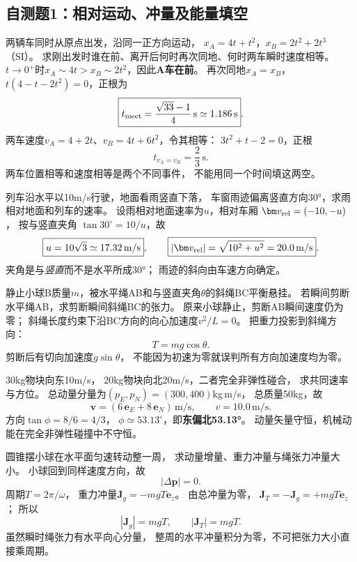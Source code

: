 \subsection{自测题1：相对运动、冲量及能量填空}

\problemtext 两辆车同时从原点出发，沿同一正方向运动，
$ x_A=4t+t^2$，$x_B=2t^2+2t^3$（SI）。
求刚出发时谁在前、离开后何时再次同地、何时两车瞬时速度相等。
\workings
$t\to0^+$时$x_A\sim4t>x_B\sim2t^2$，因此\textbf{A车在前}。
再次同地$x_A=x_B$，
$t(4-t-2t^2)=0$，正根为
\[
\boxed{t_{\rm meet}=\frac{\sqrt{33}-1}{4}\,\mathrm s
\simeq1.186\,\mathrm s}.
\]
两车速度$v_A=4+2t$、$v_B=4t+6t^2$，令其相等：
$3t^2+t-2=0$，正根
\[
\boxed{t_{v_A=v_B}=\frac23\,\mathrm s}.
\]
\crosscheck 两车位置相等和速度相等是两个不同事件，
不能用同一个时间填这两空。

\problemtext 列车沿水平以10m/s行驶，地面看雨竖直下落，
车窗雨迹偏离竖直方向30°，求雨相对地面和列车的速率。
\workings
设雨相对地面速率为$u$，相对车厢
$\bm v_{\rm rel}=(-10,-u)$，
按与竖直夹角
$\tan30^\circ=10/u$，故
\[
\boxed{u=10\sqrt3\simeq17.32\,\mathrm{m/s}},
\qquad
\boxed{|\bm v_{\rm rel}|=\sqrt{10^2+u^2}
=20.0\,\mathrm{m/s}}.
\]
\crosscheck 夹角是与\emph{竖直}而不是水平所成30°；
雨迹的斜向由车速方向确定。

\problemtext 静止小球B质量$m$，被水平绳AB和与竖直夹角$\theta$的斜绳BC平衡悬挂。
若瞬间剪断水平绳AB，求剪断瞬间斜绳BC的张力。
\workings
原来小球静止，剪断AB瞬间速度仍为零；
斜绳长度约束下沿BC方向的向心加速度$v^2/L=0$。
把重力投影到斜绳方向：
\[
\boxed{T=mg\cos\theta}.
\]
\crosscheck 剪断后有切向加速度$g\sin\theta$，
不能因为初速为零就误判所有方向加速度均为零。

\problemtext 30kg物块向东10m/s，
20kg物块向北20m/s，二者完全非弹性碰合，
求共同速率与方位。
\workings
总动量分量为$(p_E,p_N)=(300,400)$kg\,m/s，
总质量50kg，故
\[
\boxed{\bm v=(6\,\bm e_E+8\,\bm e_N)\,\mathrm{m/s}},
\qquad \boxed{v=10.0\,\mathrm{m/s}}.
\]
方向$\tan\phi=8/6=4/3$，
$\boxed{\phi\simeq53.13^\circ}$，即\textbf{东偏北53.13°}。
\crosscheck 动量矢量守恒，机械动能在完全非弹性碰撞中不守恒。

\problemtext 圆锥摆小球在水平面匀速转动整一周，
求动量增量、重力冲量与绳张力冲量大小。
\workings
小球回到同样速度方向，故
\[
\boxed{|\Delta\bm p|=0}.
\]
周期$T=2\pi/\omega$，
重力冲量$\bm J_g=-mgT\bm e_z$。
由总冲量为零，
$\bm J_T=-\bm J_g=+mgT\bm e_z$；
所以
\[
\boxed{|\bm J_g|=mgT},\qquad
\boxed{|\bm J_T|=mgT}.
\]
\crosscheck 虽然瞬时绳张力有水平向心分量，
整周的水平冲量积分为零，不可把张力大小直接乘周期。

